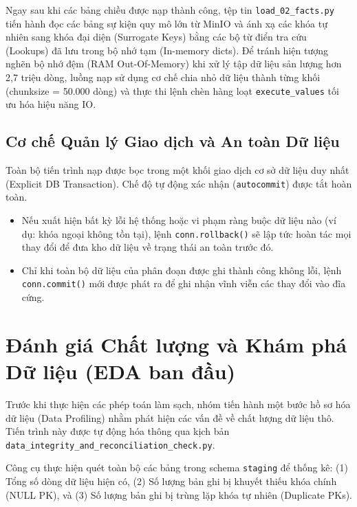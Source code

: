 \documentclass[12pt, a4paper]{report}
\begin{document}
Ngay sau khi các bảng chiều được nạp thành công, tệp tin \texttt{load\_02\_facts.py} tiến hành đọc các bảng sự kiện quy mô lớn từ MinIO và ánh xạ các khóa tự nhiên sang khóa đại diện (Surrogate Keys) bằng các bộ từ điển tra cứu (Lookups) đã lưu trong bộ nhớ tạm (In-memory dicts). Để tránh hiện tượng nghẽn bộ nhớ đệm (RAM Out-Of-Memory) khi xử lý tập dữ liệu sản lượng hơn 2,7 triệu dòng, luồng nạp sử dụng cơ chế chia nhỏ dữ liệu thành từng khối (chunksize = 50.000 dòng) và thực thi lệnh chèn hàng loạt \texttt{execute\_values} tối ưu hóa hiệu năng IO.

\subsection{Cơ chế Quản lý Giao dịch và An toàn Dữ liệu}
Toàn bộ tiến trình nạp được bọc trong một khối giao dịch cơ sở dữ liệu duy nhất (Explicit DB Transaction). Chế độ tự động xác nhận (\texttt{autocommit}) được tắt hoàn toàn. 
\begin{itemize}
    \item Nếu xuất hiện bất kỳ lỗi hệ thống hoặc vi phạm ràng buộc dữ liệu nào (ví dụ: khóa ngoại không tồn tại), lệnh \texttt{conn.rollback()} sẽ lập tức hoàn tác mọi thay đổi để đưa kho dữ liệu về trạng thái an toàn trước đó.
    \item Chỉ khi toàn bộ dữ liệu của phân đoạn được ghi thành công không lỗi, lệnh \texttt{conn.commit()} mới được phát ra để ghi nhận vĩnh viễn các thay đổi vào đĩa cứng.
\end{itemize}

\section{Đánh giá Chất lượng và Khám phá Dữ liệu (EDA ban đầu)}
\label{sec:data_quality}

Trước khi thực hiện các phép toán làm sạch, nhóm tiến hành một bước hồ sơ hóa dữ liệu (Data Profiling) nhằm phát hiện các vấn đề về chất lượng dữ liệu thô. Tiến trình này được tự động hóa thông qua kịch bản \texttt{data\_integrity\_and\_reconciliation\_check.py}. 

Công cụ thực hiện quét toàn bộ các bảng trong schema \texttt{staging} để thống kê: (1) Tổng số dòng dữ liệu hiện có, (2) Số lượng bản ghi bị khuyết thiếu khóa chính (NULL PK), và (3) Số lượng bản ghi bị trùng lặp khóa tự nhiên (Duplicate PKs). 
\end{document}
